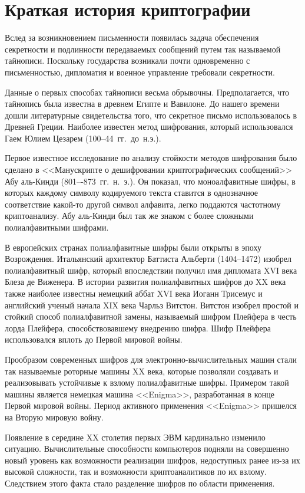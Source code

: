 \section{Краткая история криптографии}

Вслед за возникновением письменности появилась задача обеспечения секретности и подлинности передаваемых сообщений путем так называемой тайнописи. Поскольку государства возникали почти одновременно с письменностью, дипломатия и военное управление требовали секретности.

Данные о первых способах тайнописи весьма обрывочны. Предполагается, что тайнопись была известна в древнем Египте и Вавилоне. До нашего времени дошли литературные свидетельства того, что секретное письмо использовалось в Древней Греции. Наиболее известен метод шифрования, который использовался Гаем Юлием Цезарем (100--44~гг.~до~н.э.).

Первое известное исследование по анализу стойкости методов шифрования было сделано в <<Манускрипте о дешифровании криптографических сообщений>> Абу аль-Кинди (801–-873~гг.~н.~э.). Он показал, что моноалфавитные шифры, в которых каждому символу кодируемого текста ставится в однозначное соответствие какой-то другой символ алфавита, легко поддаются частотному криптоанализу. Абу аль-Кинди был так же знаком с более сложными полиалфавитными шифрами.

В европейских странах полиалфавитные шифры были открыты в эпоху Возрождения. Итальянский архитектор Баттиста Альберти (1404--1472) изобрел полиалфавитный шифр, который впоследствии получил имя дипломата XVI века Блеза де Виженера. В истории развития полиалфавитных шифров до XX века также наиболее известны немецкий аббат XVI века Иоганн Трисемус и английский ученый начала XIX века Чарльз Витстон. Витстон изобрел простой и стойкий способ полиалфавитной замены, называемый шифром Плейфера в честь лорда Плейфера, способствовавшему внедрению шифра. Шифр Плейфера использовался вплоть до Первой мировой войны.

Прообразом современных шифров для электронно-вычислительных машин стали так называемые роторные машины XX века, которые позволяли создавать и реализовывать устойчивые к взлому полиалфавитные шифры. Примером такой машины является немецкая машина <<Enigma>>, разработанная в конце Первой мировой войны. Период активного применения <<Enigma>> пришелся на Вторую мировую войну.

Появление в середине XX столетия первых ЭВМ кардинально изменило ситуацию. Вычислительные способности компьютеров подняли на совершенно новый уровень как возможности реализации шифров, недоступных ранее из-за их высокой сложности, так и возможности криптоаналитиков по их взлому. Следствием этого факта стало разделение шифров по области применения.

